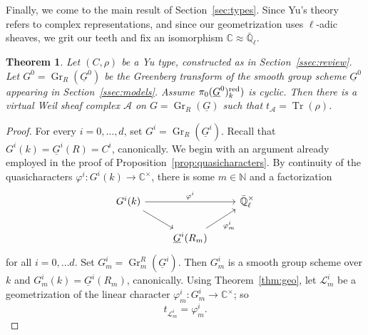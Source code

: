 \documentclass[10pt]{amsart}
\theoremstyle{plain}
\newtheorem{theorem}{Theorem}[section]
\theoremstyle{definition}
\newcommand{\NN}{{\mathbb{N}}}
\newcommand{\CC}{{\mathbb{C}}}
\newcommand{\EE}{\mathbb{\bar Q}_\ell}
\newcommand{\Fq}{k}
\newcommand{\EEx}{\EE^\times}
\DeclareMathOperator{\Gr}{Gr}
\DeclareMathOperator{\trace}{Tr}
\newcommand{\trFrob}[1]{t_{#1}}
\newcommand{\cs}[1]{{\mathcal{#1}}}
\begin{document}
Finally, we come to the main result of Section~\ref{sec:types}.
%
Since Yu's theory refers to complex representations, and since our geometrization uses $\ell$-adic sheaves, we grit our teeth and fix an isomorphism $\CC \approx \EE$.

\begin{theorem}\label{thm:geotypes}
Let $(C,\rho)$ be a Yu type, constructed as in Section~\ref{ssec:review}.
Let $G^0 = \Gr_{R}(\underline{G}^0)$ be the Greenberg transform of the smooth group scheme $\underline{G}^0$ appearing in Section~\ref{ssec:models}.
Assume $\pi_0(\underline{G}^0)_\Fq^\reductive)$ is cyclic.
Then there is a virtual Weil sheaf complex $\cs{A}$ on $G = \Gr_{R}(\underline{G})$ such that $\trFrob{\cs{A}} = \trace(\rho)$.
\end{theorem}

\begin{proof}
For every $i=0, \ldots ,d$, set $G^i = \Gr_{R}(\underline{G}^i)$.
Recall that $G^i(\Fq) = \underline{G}^i(R) = C^i$, canonically.
We begin with an argument already employed in the proof of Proposition~\ref{prop:quasicharacters}.
By continuity of the quasicharacters $\varphi^i : G^i(\Fq) \to \CC^\times$, there is some $m \in \NN$ and a factorization
\[
\begin{tikzcd}
G^i(\Fq) \arrow{rr}{\varphi^i} \arrow{rd} && \EEx\\
& \underline{G}^i(R_m) \arrow{ru}[swap]{\varphi^i_m} 
\end{tikzcd}
\] 
for all $i=0, \ldots d$.
Set $G_m^i = \Gr_m^{R}(\underline{G}^i)$.
Then $G_m^i$ is a smooth group scheme over $\Fq$ and $G_m^i(\Fq) = \underline{G}^i(R_m)$, canonically.
Using Theorem~\ref{thm:geo}, let $\cs{L}^i_m$ be a geometrization of the linear character $\varphi^i_m: G_m^i \to \CC^\times$; so
\[
\trFrob{\cs{L}^i_m} = \varphi^i_m.
\]


\end{proof}
\end{document}
